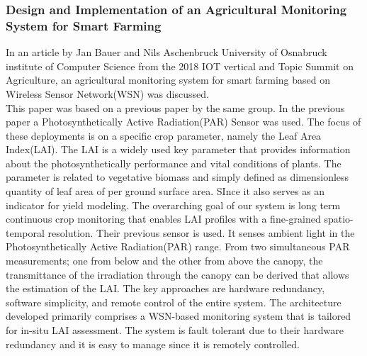 \documentclass[12pt, a4paper]{article}
\begin{document}
\subsubsection{Design and Implementation of an Agricultural Monitoring System for Smart Farming}
In an article by Jan Bauer and Nils Aschenbruck University of Osnabruck institute of Computer Science from the 2018 IOT vertical and Topic Summit on Agriculture, an agricultural monitoring system for smart farming based on Wireless Sensor Network(WSN) was discussed.\\
This paper was based on a previous paper by the same group. In the previous paper a Photosynthetically Active Radiation(PAR) Sensor was used. The focus of these deployments is on a specific crop parameter, namely the Leaf Area Index(LAI). The LAI is a widely used key parameter that provides information about the photosynthetically performance and vital conditions of plants. The parameter is related to vegetative biomass and simply defined as dimensionless quantity of leaf area of per ground surface area. SInce it also serves as an indicator for yield modeling. The overarching goal of our system is long term continuous crop monitoring that enables LAI profiles with a fine-grained  spatio-temporal resolution. Their previous sensor is used. It senses ambient light in the Photosynthetically Active Radiation(PAR) range. From two simultaneous  PAR measurements; one from below and the other from above the canopy, the transmittance of the irradiation through the canopy can be derived that allows the estimation of the LAI. The key approaches are hardware redundancy, software simplicity, and remote control of the entire system. The architecture developed primarily comprises a WSN-based monitoring system that is tailored for in-situ LAI assessment. The system is fault tolerant due to their hardware redundancy and it is easy to manage since it is remotely controlled.
\end{document}
